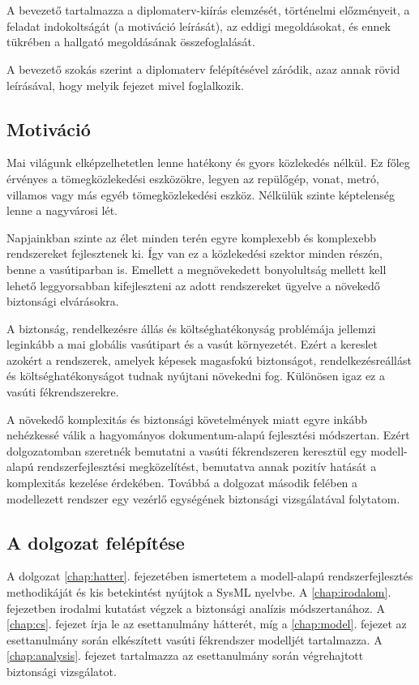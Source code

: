 \chapter{\bevezetes}

A bevezető tartalmazza a diplomaterv-kiírás elemzését, 
történelmi előzményeit, a feladat indokoltságát (a motiváció leírását), 
az eddigi megoldásokat, 
és ennek tükrében a hallgató megoldásának összefoglalását.

A bevezető szokás szerint a diplomaterv felépítésével záródik, azaz annak rövid leírásával, hogy melyik fejezet mivel foglalkozik. \cite{Mkrtychev:1997}

\section{Motiváció}
Mai világunk elképzelhetetlen lenne hatékony és gyors közlekedés nélkül.
Ez főleg érvényes a tömegközlekedési eszközökre, legyen az repülőgép, vonat, metró, villamos vagy más egyéb tömegközlekedési eszköz.
Nélkülük szinte képtelenség lenne a nagyvárosi lét.

Napjainkban szinte az élet minden terén egyre komplexebb és komplexebb rendszereket fejlesztenek ki.
Így van ez a közlekedési szektor minden részén, benne a vasútiparban is.
Emellett a megnövekedett bonyolultság mellett kell lehető leggyorsabban kifejleszteni az adott rendszereket ügyelve a növekedő biztonsági elvárásokra.

A biztonság, rendelkezésre állás és költséghatékonyság problémája jellemzi leginkább a mai globális vasútipart és a vasút környezetét.
Ezért a kereslet azokért a rendszerek, amelyek képesek magasfokú biztonságot, rendelkezésreállást és költséghatékonyságot tudnak nyújtani növekedni fog.
Különösen igaz ez a vasúti fékrendszerekre.

A növekedő komplexitás és biztonsági követelmények miatt egyre inkább nehézkessé válik a hagyományos dokumentum-alapú fejlesztési módszertan.
Ezért dolgozatomban szeretnék bemutatni a vasúti fékrendszeren keresztül egy modell-alapú rendszerfejlesztési megközelítést, bemutatva annak pozitív hatását a komplexitás kezelése érdekében.
Továbbá a dolgozat második felében a modellezett rendszer egy vezérlő egységének biztonsági vizsgálatával folytatom.

\section{A dolgozat felépítése}
A dolgozat \ref{chap:hatter}. fejezetében ismertetem a modell-alapú rendszerfejlesztés methodikáját és kis betekintést nyújtok a SysML nyelvbe.
A \ref{chap:irodalom}. fejezetben irodalmi kutatást végzek a biztonsági analízis módszertanához.
A \ref{chap:cs}. fejezet írja le az esettanulmány hátterét, míg a \ref{chap:model}. fejezet az esettanulmány során elkészített vasúti fékrendszer modelljét tartalmazza.
A \ref{chap:analysis}. fejezet tartalmazza az esettanulmány során végrehajtott biztonsági vizsgálatot.